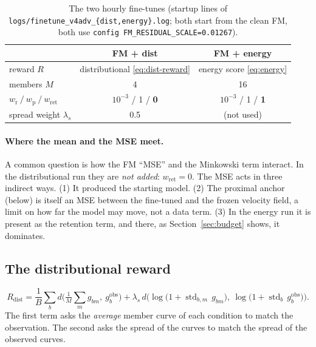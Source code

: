 \documentclass[11pt,a4paper]{article}
\begin{document}
\begin{table}[h]\centering\small
\begin{tabular}{lcc}\toprule
 & FM + dist & FM + energy\\\midrule
reward $R$ & distributional \eqref{eq:dist-reward} & energy score \eqref{eq:energy}\\
members $M$ & 4 & 16\\
$w_{\mathrm r}\ /\ w_{\mathrm p}\ /\ w_{\mathrm{ret}}$ & $10^{-3}$ / 1 / \textbf{0} & $10^{-3}$ / 1 / \textbf{1}\\
spread weight $\lambda_s$ & 0.5 & (not used)\\\bottomrule
\end{tabular}
\caption{The two hourly fine-tunes (startup lines of \texttt{logs/finetune\_v4adv\_\{dist,energy\}.log}; both start from
the clean FM, both use \texttt{config FM\_RESIDUAL\_SCALE=0.01267}).}
\end{table}

\paragraph{Where the mean and the MSE meet.} A common question is how the FM ``MSE'' and the Minkowski term interact.
In the distributional run they are \emph{not added}: $w_{\mathrm{ret}} = 0$. The MSE acts in three indirect ways. (1) It
produced the starting model. (2) The proximal anchor (below) is itself an MSE between the fine-tuned and the frozen
velocity field, a limit on how far the model may move, not a data term. (3) In the energy run it is present as the
retention term, and there, as Section~\ref{sec:budget} shows, it dominates.

\subsection{The distributional reward}\label{sec:dist}
\begin{equation}\label{eq:dist-reward}
  R_{\mathrm{dist}} = \frac1B\sum_{b} d\Big(\tfrac1M\textstyle\sum_m g_{bm},\ g^{\mathrm{obs}}_b\Big)
  + \lambda_s\, d\Big(\log\!\big(1+\operatorname{std}_{b,m}\, g_{bm}\big),\ \log\!\big(1+\operatorname{std}_b\, g^{\mathrm{obs}}_b\big)\Big).
\end{equation}
The first term asks the \emph{average} member curve of each condition to match the observation. The second asks the
spread of the curves to match the spread of the observed curves.
\end{document}
